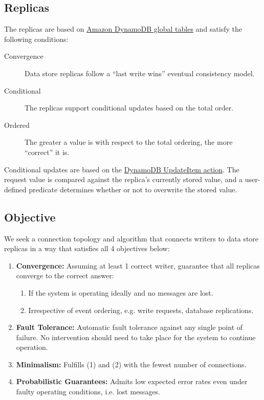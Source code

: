 \documentclass[12pt]{article}
\begin{document}
\subsection{Replicas} \label{replicas}

The replicas are based on \href{https://aws.amazon.com/dynamodb/global-tables/}{Amazon DynamoDB global tables} and satisfy the following conditions:
\begin{description}
	\item[Convergence] Data store replicas follow a ``last write wins'' eventual consistency model.
	
	\item[Conditional] The replicas support conditional updates based on the total order.
	
	\item[Ordered] The greater a value is with respect to the total ordering, the more ``correct'' it is. 
\end{description}
Conditional updates are based on the \href{https://docs.aws.amazon.com/amazondynamodb/latest/APIReference/API_UpdateItem.html}{DynamoDB UpdateItem action}. The request value is compared against the replica's currently stored value, and a user-defined predicate determines whether or not to overwrite the stored value.

\subsection{Objective} \label{objective}

We seek a connection topology and algorithm that connects writers to data store replicas in a way that satisfies all 4 objectives below: 
\begin{enumerate}
	\item \textbf{Convergence:} Assuming at least 1 correct writer, guarantee that all replicas converge to the correct answer:
	\begin{enumerate}
		\item If the system is operating ideally and no messages are lost.
		
		\item Irrespective of event ordering, e.g. write requests, database replications.
	\end{enumerate}
	
	\item \textbf{Fault Tolerance:} Automatic fault tolerance against any single point of failure. No intervention should need to take place for the system to continue operation.
	
	\item \textbf{Minimalism:} Fulfills (1) and (2) with the fewest number of connections.
	
	\item \textbf{Probabilistic Guarantees:} Admits low expected error rates even under faulty operating conditions, i.e. lost messages.
\end{enumerate}
\end{document}

